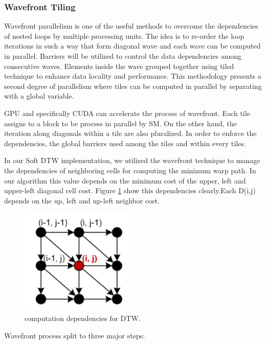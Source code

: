 \documentclass[12pt, letterpaper]{article}
\begin{document}
\subsubsection{Wavefront Tiling}
Wavefront parallelism is one of the useful methods to overcome the dependencies
of nested loops by multiple processing units. The idea is to re-order the loop
iterations in such a way that form diagonal wave and each wave can be computed
in parallel. Barriers will be utilized to control the data dependencies among
consecutive waves. Elements inside the wave grouped together using tiled
technique to enhance data locality and performance. This methodology presents a
second degree of parallelism where tiles can be computed in parallel by
separating with a global variable.

GPU and specifically CUDA can accelerate the process of wavefront. Each tile
assigns to a block to be process in parallel by SM. On the other hand, the
iteration along diagonals within a tile are also pluralized. In order to enforce
the dependencies, the global barriers used among the tiles and within every
tiles.\cite{belviranli_peerwave_2015}

In our Soft DTW implementation, we utilized the wavefront technique to manage
the dependencies of neighboring cells for computing the minimum warp path. In
our algorithm this value depends on the minimum cost of the upper, left and
upper-left diagonal cell cost. Figure \ref{DTW_dependency} show this
dependencies clearly.Each D(i,j) depends on the up, left and up-left neighbor
cost.

\begin{figure}[htbp]
\includegraphics[height=2in]{img/tiling_dependencies.png}
\centering
\caption{computation dependencies for DTW.}
\label{DTW_dependency}
\end{figure}

Wavefront process split to three major steps:
\end{document}
